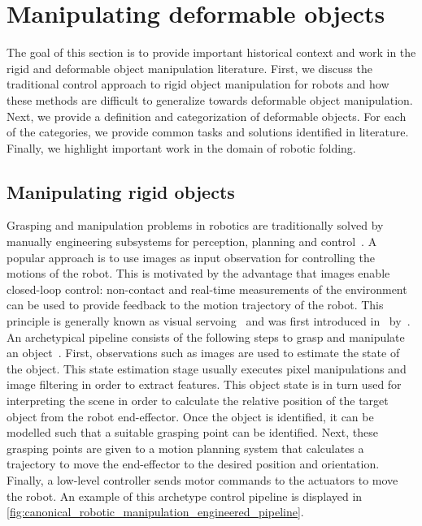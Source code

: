 \section{Manipulating deformable objects} \label{sec:lit_traditional}

The goal of this section is to provide important historical context and work in the rigid and deformable object manipulation literature. First, we discuss the traditional control approach to rigid object manipulation for robots and how these methods are difficult to generalize towards deformable object manipulation. Next, we provide a definition and categorization of deformable objects. For each of the categories, we provide common tasks and solutions identified in literature. Finally, we highlight important work in the domain of robotic folding.

\subsection{Manipulating rigid objects}
Grasping and manipulation problems in robotics are traditionally solved by manually engineering subsystems for perception, planning and control~\autocite{Siciliano2008}. A popular approach is to use images as input observation for controlling the motions of the robot. This is motivated by the advantage that images enable closed-loop control: non-contact and real-time measurements of the environment can be used to provide feedback to the motion trajectory of the robot. This principle is generally known as visual servoing~\autocite{Hutchinson1996} and was first introduced in~\citeyear{Hill1979} by~\textcite{Hill1979}. An archetypical pipeline consists of the following steps to grasp and manipulate an object~\autocite{Corke1996}. First, observations such as images are used to estimate the state of the object. This state estimation stage usually executes pixel manipulations and image filtering in order to extract features. This object state is in turn used for interpreting the scene in order to calculate the relative position of the target object from the robot end-effector. Once the object is identified, it can be modelled such that a suitable grasping point can be identified. Next, these grasping points are given to a motion planning system that calculates a trajectory to move the end-effector to the desired position and orientation. Finally, a low-level controller sends motor commands to the actuators to move the robot. An example of this archetype control pipeline is displayed in \cref{fig:canonical_robotic_manipulation_engineered_pipeline}.

